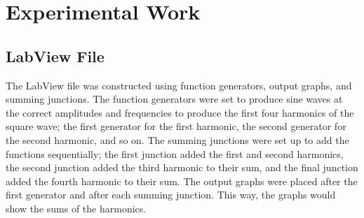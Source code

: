 \documentclass[a4paper,titlepage]{article}
\begin{document}
	\section{Experimental Work}
	\subsection{LabView File}
	
	The LabView file was constructed using function generators, output graphs, and summing junctions. The function generators were set to produce sine waves at the correct amplitudes and frequencies to produce the first four harmonics of the square wave; the first generator for the first harmonic, the second generator for the second harmonic, and so on. The summing junctions were set up to add the functions sequentially; the first junction added the first and second harmonics, the second junction added the third harmonic to their sum, and the final junction added the fourth harmonic to their sum. The output graphs were placed after the first generator and after each summing junction. This way, the graphs would show the sums of the harmonics.
\end{document}
